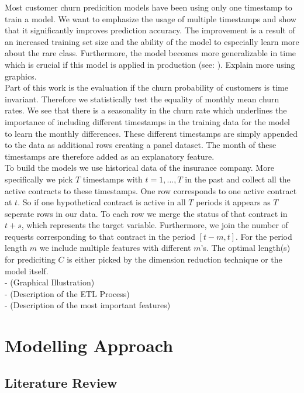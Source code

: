 \documentclass[12pt,titlepage]{article}
\begin{document}
Most customer churn predicition models have been using only one timestamp to train a model. We want to emphasize the usage of multiple timestamps and show that it significantly improves prediction accuracy. The improvement is a result of an increased training set size and the ability of the model to especially learn more about the rare class. Furthermore, the model becomes more generalizable in time which is crucial if this model is applied in
production (see: \cite{multiplets}). Explain more using graphics.\\
Part of this work is the evaluation if the churn probability of customers is time invariant. Therefore we statistically test the equality of monthly mean churn rates. We see that there is a seasonality in the churn rate which underlines the
importance of including different timestamps in the training data for the model to learn the monthly differences. These different timestamps are simply appended to the data as additional rows creating a panel dataset. The month of these timestamps are therefore added as an explanatory feature. \\
To build the models we use historical data of the insurance company. More specifically we pick $T$ timestamps with
$t = 1,...,T$ in the past and collect all the active contracts to these timestamps. One row corresponds to one active contract at $t$. So if one hypothetical contract is active in all $T$ periods it appears as $T$ seperate rows in our data. To each row we merge the status of that contract in $t+s$, which represents the target variable. Furthermore, we join the number of requests corresponding to that contract in the period $[t-m, t]$. For the period length $m$ we include multiple features with different $m$'s. The optimal length(s) for prediciting $C$ is either picked by the dimension reduction technique or the model itself. \\

- (Graphical Illustration) \\
- (Description of the ETL Process) \\
- (Description of the most important features) \\

\section{Modelling Approach} \par

\subsection{Literature Review} \par
\end{document}
